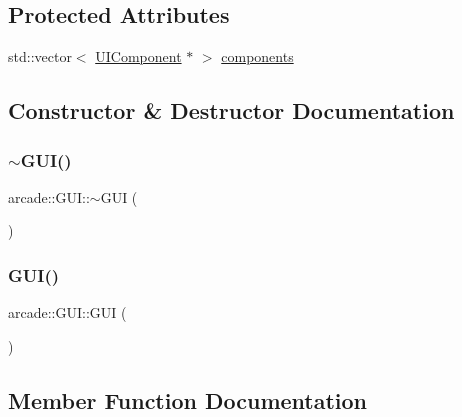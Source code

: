 \subsection*{Protected Attributes}
\begin{DoxyCompactItemize}
\item 
std\+::vector$<$ \hyperlink{classarcade_1_1_u_i_component}{U\+I\+Component} $\ast$ $>$ \hyperlink{classarcade_1_1_g_u_i_a190c384b099301972698f9bb410474de}{components}
\end{DoxyCompactItemize}


\subsection{Constructor \& Destructor Documentation}
\mbox{\label{classarcade_1_1_g_u_i_a303ab9f358e535d6e08bcf63a7175a96}} 
\subsubsection{\texorpdfstring{$\sim$\+G\+U\+I()}{~GUI()}}
{\footnotesize\ttfamily arcade\+::\+G\+U\+I\+::$\sim$\+G\+UI (\begin{DoxyParamCaption}{ }\end{DoxyParamCaption})\hspace{0.3cm}{\ttfamily [virtual]}}

\mbox{\label{classarcade_1_1_g_u_i_a320bdccbea68b4485ec98667735009d2}} 
\subsubsection{\texorpdfstring{G\+U\+I()}{GUI()}}
{\footnotesize\ttfamily arcade\+::\+G\+U\+I\+::\+G\+UI (\begin{DoxyParamCaption}{ }\end{DoxyParamCaption})}



\subsection{Member Function Documentation}
\mbox{\label{classarcade_1_1_g_u_i_aa6d6547eb12710f098d1a328f5eee7d4}} 
